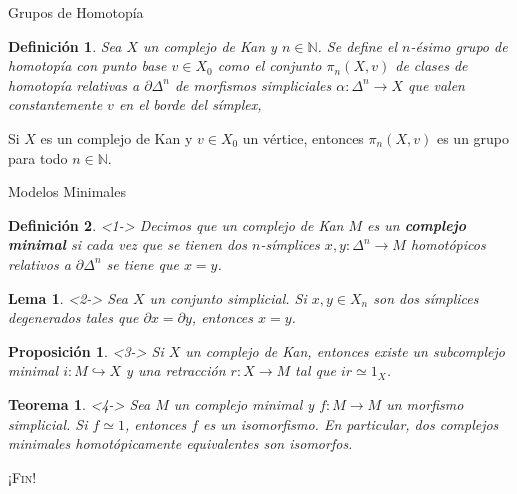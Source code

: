 \documentclass[11pt]{beamer}
\newcommand{\N}{\mathbb{N}}
\renewcommand{\ss}[1]{\Delta^{#1}}
\newtheorem{defs}{Definición}
\newtheorem{teo}{Teorema}
\newtheorem{prop}{Proposición}
\newtheorem{lema}{Lema}
\begin{document}
\begin{frame}{Grupos de Homotopía} 

\begin{defs} Sea $X$ un complejo de Kan y $n \in \N$. Se define el $n$-ésimo grupo de homotopía con punto base $v \in X_0$ como el conjunto $\pi_n(X,v)$ de clases de homotopía relativas a $\partial \ss{n}$ de morfismos simpliciales $\alpha : \ss{n} \to X$ que valen constantemente $v$ en el borde del símplex,
\begin{center}
\end{center}
\end{defs}
\begin{theorem} Si $X$ es un complejo de Kan y $v \in X_0$ un vértice, entonces $\pi_n(X,v)$ es un grupo para todo $n \in \N$.
\end{theorem}
\end{frame}

\begin{frame}{Modelos Minimales}

\begin{defs} <1-> Decimos que un complejo de Kan $M$ es un \textbf{complejo minimal} si cada vez que se tienen dos $n$-símplices $x,y \colon \ss{n} \to M$  homotópicos relativos a $\partial \ss{n}$ se tiene que $x = y$.
\end{defs}

\begin{lema} <2-> Sea $X$ un conjunto simplicial. Si $x,y \in X_n$ son dos símplices degenerados tales que $\partial x = \partial y$, entonces $x = y$. 
\end{lema}

\begin{prop} <3-> Si $X$ un complejo de Kan, entonces existe un subcomplejo minimal $i : M \hookrightarrow X$ y una retracción $r : X \to M$ tal que $ir \simeq 1_X$. 
\end{prop}

\begin{teo} <4-> Sea $M$ un complejo minimal y $f : M \to M$ un morfismo simplicial. Si $f \simeq 1$, entonces $f$ es un isomorfismo. En particular, dos complejos minimales homotópicamente equivalentes son isomorfos.
\end{teo}
\end{frame}
\begin{frame}
\begin{center}
\scshape \LARGE ¡Fin!
\end{center}
\end{frame}
\end{document}
